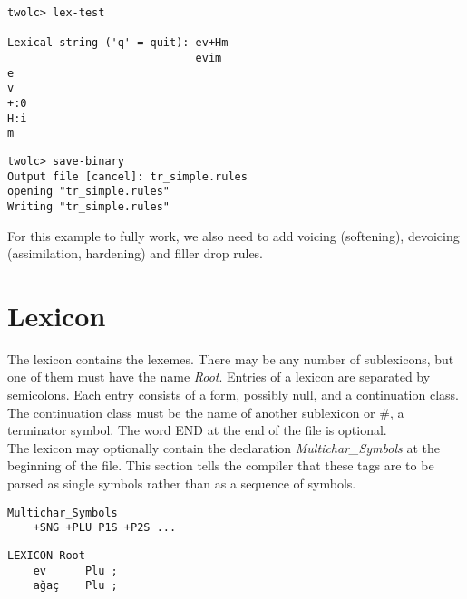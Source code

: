 \documentclass[11pt,a4paper]{article}
\begin{document}
\newpage

\begin{lstlisting}[caption={Test your rules to see they can match a lexical form with its surface representation}, belowskip=1em,frame=single]
twolc> lex-test

Lexical string ('q' = quit): ev+Hm
                             evim
e
v
+:0
H:i
m
\end{lstlisting}

\begin{lstlisting}[caption={Save your transducer so that you can use it with lexicon compiler}, belowskip=1em,frame=single]
twolc> save-binary
Output file [cancel]: tr_simple.rules
opening "tr_simple.rules"
Writing "tr_simple.rules"
\end{lstlisting}

\setcounter{lstlisting}{0}

For this example to fully work, we also need to add voicing (softening), devoicing (assimilation, hardening) and filler drop rules.


\section{Lexicon}

The lexicon contains the lexemes. There may be any number of sublexicons, but one of them must have the name \textit{Root}.
Entries of a lexicon are separated by semicolons. Each entry consists of a form, possibly null, and a continuation class. The continuation class must be the name of another sublexicon or \#, a terminator symbol. The word END at the end of the file is optional.\\

The lexicon may optionally contain the declaration \textit{Multichar\_Symbols} at the beginning of the file. This section tells the compiler that these tags are to be parsed as single symbols rather than as a sequence of symbols. \\

\begin{lstlisting}[title={Optional multiple character symbols}, belowskip=1em,frame=single]
Multichar_Symbols
    +SNG +PLU P1S +P2S ...
\end{lstlisting}

\begin{lstlisting}[title={Begin with Root, next state is Plu for ev and ağaç}, belowskip=1em,frame=single]
LEXICON Root
    ev      Plu ;
    ağaç    Plu ;
\end{lstlisting}
\end{document}
